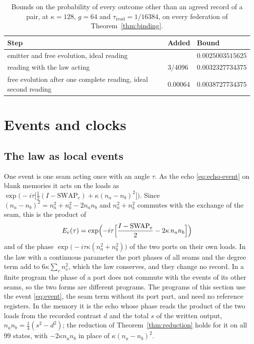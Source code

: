 \documentclass[11pt]{article}
\theoremstyle{definition}
\theoremstyle{remark}
\theoremstyle{plain}
\newcommand{\SWAP}{\mathrm{SWAP}}
\begin{document}
\begin{table}[!htb]
\centering
\caption{Bounds on the probability of every outcome other than an agreed
record of a pair, at $\kappa=128$, $g=64$ and
$\tau_{\mathrm{read}}=1/16384$, on every federation of
Theorem~\ref{thm:binding}.}
\label{tab:budget}
\begin{tabular}{@{}L{8.2cm}ll@{}}
\toprule
Step & Added & Bound \\
\midrule
emitter and free evolution, ideal reading & & $0.0025003515625$ \\
reading with the law acting & $3/4096$ & $0.0032327734375$ \\
free evolution after one complete reading, ideal second reading & $0.00064$ & $0.0038727734375$ \\
\bottomrule
\end{tabular}
\end{table}


\section{Events and clocks}
\label{sec:events}

\subsection{The law as local events}

One event is one seam acting once with an angle $\tau$. As the echo
\eqref{eq:echo-event} on blank memories it acts on the loads as
$\exp\bigl(-i\tau\bigl[\tfrac12(I-\SWAP_e)+\kappa(n_a-n_b)^2\bigr]\bigr)$.
Since $(n_a-n_b)^2=n_a^2+n_b^2-2n_an_b$ and $n_a^2+n_b^2$ commutes with the
exchange of the seam, this is the product of
\begin{equation}
E_e(\tau)=\exp\Bigl(-i\tau\Bigl[\frac{I-\SWAP_e}{2}-2\kappa\,n_an_b\Bigr]\Bigr)
\label{eq:event}
\end{equation}
and of the phase $\exp\bigl(-i\tau\kappa(n_a^2+n_b^2)\bigr)$ of the two
ports on their own loads. In the law with a continuous parameter the port
phases of all seams and the degree term add to $6\kappa\sum_vn_v^2$, which
the law conserves, and they change no record. In a finite program the phase
of a port does not commute with the events of its other seams, so the two
forms are different programs. The programs of this section use the event
\eqref{eq:event}, the seam term without its port part, and need no
reference registers. In the memory it is the echo whose phase reads the
product of the two loads from the recorded contrast $d$ and the total $s$
of the written output, $n_an_b=\tfrac14(s^2-d^2)$; the reduction of
Theorem~\ref{thm:reduction} holds for it on all $99$ states, with
$-2\kappa n_an_b$ in place of $\kappa(n_a-n_b)^2$.
\end{document}
